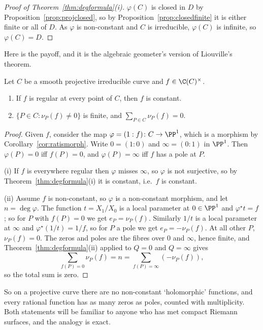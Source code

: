 \begin{proof}[Proof of Theorem~\ref{thm:degformula}(i)]
	$\varphi(C)$ is closed in $D$ by Proposition~\ref{prop:projclosed}, so by Proposition~\ref{prop:closedfinite} it is either finite or all of $D$. As $\varphi$ is non-constant and $C$ is irreducible, $\varphi(C)$ is infinite, so $\varphi(C) = D$.
\end{proof}

Here is the payoff, and it is the algebraic geometer's version of Liouville's theorem.

\begin{corollary}\label{cor:liouville}
	Let $C$ be a smooth projective irreducible curve and $f \in \C(C)^\times$.
	\begin{enumerate}[label=(\roman*)]
		\item If $f$ is regular at every point of $C$, then $f$ is constant.
		\item $\{P \in C : \nu_P(f)\neq 0\}$ is finite, and $\displaystyle\sum_{P\in C}\nu_P(f) = 0$.
	\end{enumerate}
\end{corollary}

\begin{proof}
	Given $f$, consider the map $\varphi = (1 : f) \colon C \to \PP^1$, which is a morphism by Corollary~\ref{cor:ratismorph}. Write $0 = (1:0)$ and $\infty = (0:1)$ in $\PP^1$. Then $\varphi(P) = 0$ iff $f(P) = 0$, and $\varphi(P) = \infty$ iff $f$ has a pole at $P$.

	(i) If $f$ is everywhere regular then $\varphi$ misses $\infty$, so $\varphi$ is not surjective, so by Theorem~\ref{thm:degformula}(i) it is constant, i.e.\ $f$ is constant.

	(ii) Assume $f$ is non-constant, so $\varphi$ is a non-constant morphism, and let $n = \deg\varphi$. The function $t = X_1/X_0$ is a local parameter at $0 \in \PP^1$ and $\varphi^\star t = f$; so for $P$ with $f(P) = 0$ we get $e_P = \nu_P(f)$. Similarly $1/t$ is a local parameter at $\infty$ and $\varphi^\star(1/t) = 1/f$, so for $P$ a pole we get $e_P = -\nu_P(f)$. At all other $P$, $\nu_P(f) = 0$. The zeros and poles are the fibres over $0$ and $\infty$, hence finite, and Theorem~\ref{thm:degformula}(ii) applied to $Q = 0$ and $Q = \infty$ gives
	$$\sum_{f(P) = 0}\nu_P(f) = n = \sum_{f(P) = \infty}(-\nu_P(f)),$$
	so the total sum is zero.
\end{proof}

So on a projective curve there are no non-constant `holomorphic' functions, and every rational function has as many zeros as poles, counted with multiplicity. Both statements will be familiar to anyone who has met compact Riemann surfaces, and the analogy is exact.

